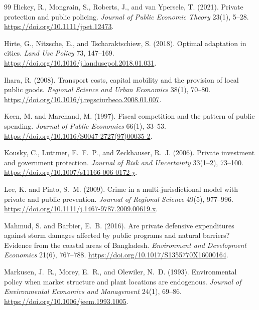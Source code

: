 \begin{thebibliography}{99}
Hickey, R., Mongrain, S., Roberts, J., and van Ypersele, T. (2021).
\newblock Private protection and public policing.
\newblock \emph{Journal of Public Economic Theory} 23(1), 5--28. \url{https://doi.org/10.1111/jpet.12473}.

Hirte, G., Nitzsche, E., and Tscharaktschiew, S. (2018).
\newblock Optimal adaptation in cities.
\newblock \emph{Land Use Policy} 73, 147--169. \url{https://doi.org/10.1016/j.landusepol.2018.01.031}.

Ihara, R. (2008).
\newblock Transport costs, capital mobility and the provision of local public goods.
\newblock \emph{Regional Science and Urban Economics} 38(1), 70--80. \url{https://doi.org/10.1016/j.regsciurbeco.2008.01.007}.

Keen, M. and Marchand, M. (1997).
\newblock Fiscal competition and the pattern of public spending.
\newblock \emph{Journal of Public Economics} 66(1), 33--53.
\url{https://doi.org/10.1016/S0047-2727(97)00035-2}.

Kousky, C., Luttmer, E.~F.~P., and Zeckhauser, R.~J. (2006).
\newblock Private investment and government protection.
\newblock \emph{Journal of Risk and Uncertainty} 33(1--2), 73--100. \url{https://doi.org/10.1007/s11166-006-0172-y}.

Lee, K. and Pinto, S.~M. (2009).
\newblock Crime in a multi-jurisdictional model with private and public prevention.
\newblock \emph{Journal of Regional Science} 49(5), 977--996. \url{https://doi.org/10.1111/j.1467-9787.2009.00619.x}.

Mahmud, S. and Barbier, E.~B. (2016).
\newblock Are private defensive expenditures against storm damages affected by public programs and natural barriers? Evidence from the coastal areas of Bangladesh.
\newblock \emph{Environment and Development Economics} 21(6), 767--788. \url{https://doi.org/10.1017/S1355770X16000164}.

Markusen, J.~R., Morey, E.~R., and Olewiler, N.~D. (1993).
\newblock Environmental policy when market structure and plant locations are endogenous.
\newblock \emph{Journal of Environmental Economics and Management} 24(1), 69--86. \url{https://doi.org/10.1006/jeem.1993.1005}.


\end{thebibliography}
